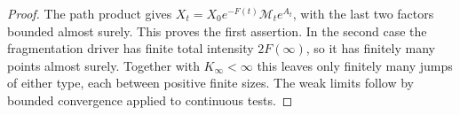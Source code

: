 \begin{proof}
The path product gives
$X_t=X_0e^{-F(t)}\mathcal M_t e^{A_t}$, with the last two factors
bounded almost surely. This proves the first assertion. In the second
case the fragmentation driver has finite total intensity $2F(\infty)$,
so it has finitely many points almost surely. Together with
$K_\infty<\infty$ this leaves only finitely many jumps of either type,
each between positive finite sizes. The weak limits follow by bounded
convergence applied to continuous tests.
\end{proof}
